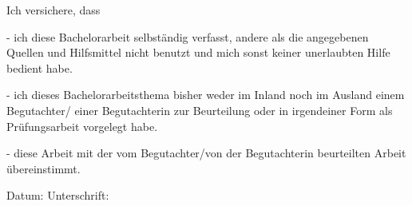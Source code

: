\label{erklaerung}

\begin{flushleft}
Ich versichere, dass 
\end{flushleft}

\begin{flushleft}
- ich diese Bachelorarbeit selbständig verfasst, andere als die angegebenen Quellen und Hilfsmittel nicht benutzt und mich sonst keiner unerlaubten Hilfe bedient habe.
\end{flushleft}

\begin{flushleft}
- ich dieses Bachelorarbeitsthema bisher weder im Inland noch im Ausland einem Begutachter/ einer Begutachterin zur Beurteilung oder in irgendeiner Form als Prüfungsarbeit vorgelegt habe.	
\end{flushleft}

\begin{flushleft}
- diese Arbeit mit der vom Begutachter/von der Begutachterin beurteilten Arbeit übereinstimmt. \\[1.5cm]	
\end{flushleft}
Datum:	\hrulefill\enspace Unterschrift: \hrulefill
\\[3.5cm]



